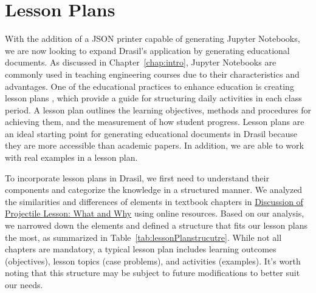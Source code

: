 \chapter{Lesson Plans} \label{chap:lessonplan}
With the addition of a JSON printer capable of generating Jupyter Notebooks, we 
are now looking to expand Drasil's application by generating educational 
documents. As discussed in Chapter~\ref{chap:intro}, Jupyter Notebooks are 
commonly used in teaching engineering courses due to their characteristics and 
advantages. One of the educational practices to enhance education is creating 
lesson plans \cite{cicek2013effective, wong2018first}, which provide a 
guide for structuring daily activities in each class period. A lesson plan 
outlines the learning objectives, methods and procedures for achieving them, 
and the measurement of how student progress. Lesson plans are an ideal starting 
point for generating educational documents in Drasil because they are more 
accessible than academic papers. In addition, we are able to work with real 
examples in a lesson plan. 

To incorporate lesson plans in Drasil, we first need to understand their 
components and categorize the knowledge in a structured manner. We analyzed the 
similarities and differences of elements in textbook chapters in 
\href{https://github.com/smiths/caseStudies/blob/master/CaseStudies/projectile/projectileLesson/AboutProjectileLesson.pdf}{Discussion
 of Projectile Lesson: What and	Why} using online resources. Based on our 
analysis, we narrowed down the elements and defined a structure that fits our 
lesson plans the most, as summarized in Table~\ref{tab:lessonPlanstrucutre}. 
While not all chapters are mandatory, a typical lesson plan includes learning 
outcomes (objectives), lesson topics (case problems), and activities (examples).
It's worth noting that this structure may be subject to future modifications to 
better suit our needs. 

